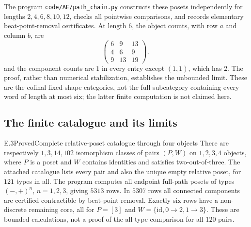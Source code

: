 The program \texttt{code/AE/path\_chain.py} constructs these posets independently for lengths $2,4,6,8,10,12$, checks all pointwise comparisons, and records elementary beat-point-removal certificates. At length $6$, the object counts, with row $a$ and column $b$, are
\[
 \begin{pmatrix}6&9&13\\4&6&9\\9&13&19\end{pmatrix},
\]
and the component counts are $1$ in every entry except $(1,1)$, which has $2$. The proof, rather than numerical stabilization, establishes the unbounded limit. These are the cofinal fixed-shape categories, not the full subcategory containing every word of length at most six; the latter finite computation is not claimed here.

\subsection{The finite catalogue and its limits}
\begin{result}{E.3}{Proved}{Complete relative-poset catalogue through four objects}
There are respectively $1,3,14,102$ isomorphism classes of pairs $(P,W)$ on $1,2,3,4$ objects, where $P$ is a poset and $W$ contains identities and satisfies two-out-of-three. The attached catalogue lists every pair and also the unique empty relative poset, for $121$ types in all. The program computes all endpoint full-path posets of types $(-,+)^n$, $n=1,2,3$, giving $5313$ rows. In $5307$ rows all connected components are certified contractible by beat-point removal. Exactly six rows have a non-discrete remaining core, all for $P=[3]$ and $W=\{\mathrm{id},0\to2,1\to3\}$. These are bounded calculations, not a proof of the all-type comparison for all $120$ pairs.
\end{result}
